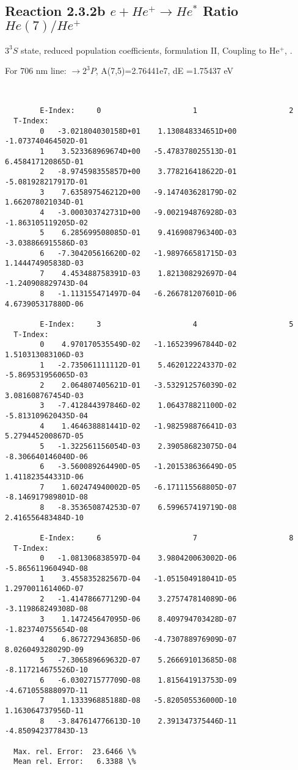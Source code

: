 \documentclass[12pt,dvipdfmx]{article}
\begin{document}
\subsection{
  Reaction 2.3.2b $e + He^+ \rightarrow He^*  $ Ratio $He(7)/He^+$
}

  $3^3S$ state,
  reduced population coefficients, formulation II,
  Coupling to He$^+$, \cite{kn:Fujimoto}.

  For 706 nm line: $\rightarrow 2^3P$, A(7,5)=2.76441e7, dE =1.75437 eV

\begin{small}\begin{verbatim}


        E-Index:     0                     1                     2
  T-Index:
        0   -3.021804030158D+01    1.130848334651D+00   -1.073740464502D-01
        1    3.523368969674D+00   -5.478378025513D-01    6.458417120865D-01
        2   -8.974598355857D+00    3.778216418622D-01   -5.081928217917D-01
        3    7.635897546212D+00   -9.147403628179D-02    1.662078021034D-01
        4   -3.000303742731D+00   -9.002194876928D-03   -1.863105119205D-02
        5    6.285699508085D-01    9.416908796340D-03   -3.038866915586D-03
        6   -7.304205616620D-02   -1.989766581715D-03    1.144474905838D-03
        7    4.453488758391D-03    1.821308292697D-04   -1.240908829743D-04
        8   -1.113155471497D-04   -6.266781207601D-06    4.673905317880D-06

        E-Index:     3                     4                     5
  T-Index:
        0    4.970170535549D-02   -1.165239967844D-02    1.510313083106D-03
        1   -2.735061111112D-01    5.462012224337D-02   -5.869531956065D-03
        2    2.064807405621D-01   -3.532912576039D-02    3.081608767454D-03
        3   -7.412844397846D-02    1.064378821100D-02   -5.813109620435D-04
        4    1.464638881441D-02   -1.982598876641D-03    5.279445200867D-05
        5   -1.322561156054D-03    2.390586823075D-04   -8.306640146040D-06
        6   -3.560089264490D-05   -1.201538636649D-05    1.411823544331D-06
        7    1.602474940002D-05   -6.171115568805D-07   -8.146917989801D-08
        8   -8.353650874253D-07    6.599657419719D-08    2.416556483484D-10

        E-Index:     6                     7                     8
  T-Index:
        0   -1.081306838597D-04    3.980420063002D-06   -5.865611960494D-08
        1    3.455835282567D-04   -1.051504918041D-05    1.297001161406D-07
        2   -1.414786677129D-04    3.275747814089D-06   -3.119868249308D-08
        3    1.147245647095D-06    8.409794703428D-07   -1.823740755654D-08
        4    6.867272943685D-06   -4.730788976909D-07    8.026049328029D-09
        5   -7.306589669632D-07    5.266691013685D-08   -8.117214675526D-10
        6   -6.030271577709D-08    1.815641913753D-09   -4.671055888097D-11
        7    1.133396885188D-08   -5.820505536000D-10    1.163064737956D-11
        8   -3.847614776613D-10    2.391347375446D-11   -4.850942377843D-13

  Max. rel. Error:  23.6466 \%
  Mean rel. Error:   6.3388 \%


\end{verbatim}\end{small}
\end{document}

